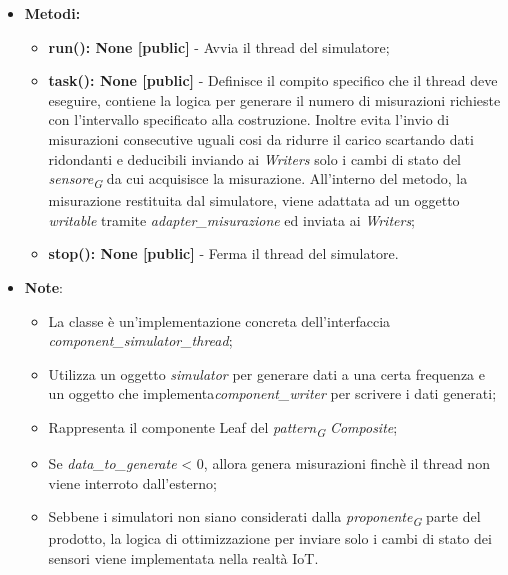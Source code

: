 \begin{itemize}
\begin{itemize}
        \item \textbf{Metodi:}
        \begin{itemize}
            \item \textbf{run(): None [public]} - Avvia il thread del simulatore;
            \item \textbf{task(): None [public]} - Definisce il compito specifico che il thread deve eseguire, contiene la logica per generare il numero di misurazioni richieste con l'intervallo specificato alla costruzione.
            Inoltre evita l'invio di misurazioni consecutive uguali cosi da ridurre il carico scartando dati ridondanti e deducibili inviando ai \textit{Writers} solo i cambi di stato del \textit{sensore}\textsubscript{\textit{G}} da cui acquisisce la misurazione.
            All'interno del metodo, la misurazione restituita dal simulatore, viene adattata ad un oggetto \textit{writable} tramite \textit{adapter\_misurazione} ed inviata ai \textit{Writers};
            \item \textbf{stop(): None [public]} - Ferma il thread del simulatore.
        \end{itemize}
        \item\textbf{Note}:
        \begin{itemize}
            \item La classe è un'implementazione concreta dell'interfaccia \textit{component\_simulator\_thread};
            \item Utilizza un oggetto \textit{\textit{simulator}} per generare dati a una certa frequenza e un oggetto che implementa\textit{component\_writer} per scrivere i dati generati;
            \item Rappresenta il componente Leaf del \textit{pattern}\textsubscript{\textit{G}} \textit{Composite};
            \item Se \textit{data\_to\_generate} < 0, allora genera misurazioni finchè il thread non viene interroto dall'esterno;
            \item Sebbene i simulatori non siano considerati dalla \textit{proponente}\textsubscript{\textit{G}} parte del prodotto, la logica di ottimizzazione per inviare solo i cambi di stato dei sensori viene implementata nella realtà IoT.
            

\end{itemize}
\end{itemize}
\end{itemize}
